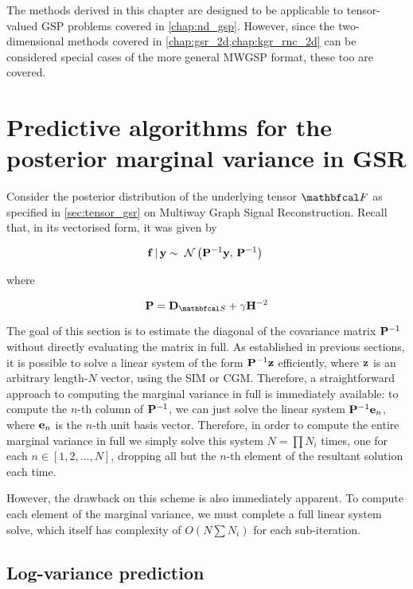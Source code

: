 The methods derived in this chapter are designed to be applicable to tensor-valued GSP problems covered in \cref{chap:nd_gsp}. However, since the two-dimensional methods covered in \cref{chap:gsr_2d,chap:kgr_rnc_2d} can be considered special cases of the more general MWGSP format, these too are covered. 

\section{Predictive algorithms for the posterior marginal variance in GSR}

Consider the posterior distribution of the underlying tensor $\Ft$ as specified in \cref{sec:tensor_gsr} on Multiway Graph Signal Reconstruction. Recall that, in its vectorised form, it was given by 

\begin{equation}
    \mathbf{f} \, | \, \mathbf{y} \sim \; \mathcal{N}\left(\mathbf{P}^{-1} \mathbf{y}, \, \mathbf{P}^{-1}\right) \;
\end{equation}

where 

\begin{equation}
    \PP = \D_{\St} + \gamma \HH^{-2}
\end{equation}

The goal of this section is to estimate the diagonal of the covariance matrix $\mathbf{P}^{-1}$ without directly evaluating the matrix in full. As established in previous sections, it is possible to solve a linear system of the form $\mathbf{P}^{-1} \mathbf{z}$ efficiently, where $\mathbf{z}$ is an arbitrary length-$N$ vector, using the SIM or CGM. Therefore, a straightforward approach to computing the marginal variance in full is immediately available: to compute the $n$-th column of $\mathbf{P}^{-1}$, we can just solve the linear system $\mathbf{P}^{-1} \mathbf{e}_n$, where $\mathbf{e}_n$ is the $n$-th unit basis vector. Therefore, in order to compute the entire marginal variance in full we simply solve this system $N = \prod N_i$ times, one for each $n \in [1, 2, ..., N]$, dropping all but the $n$-th element of the resultant solution each time. 

However, the drawback on this scheme is also immediately apparent. To compute each element of the marginal variance, we must complete a full linear system solve, which itself has complexity of $O(N \sum N_i)$ for each sub-iteration. 

\subsection{Log-variance prediction}

